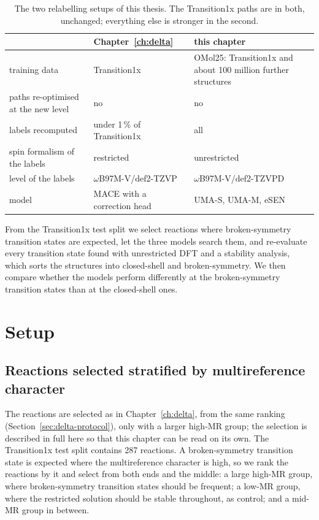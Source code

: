 \begin{table}[h]
\centering
\small
\caption{The two relabelling setups of this thesis. The Transition1x
paths are in both, unchanged; everything else is stronger in the
second.}
\label{tab:delta-vs-omol}
\begin{tabular}{@{}llp{5.5cm}@{}}
\toprule
 & Chapter~\ref{ch:delta} & this chapter \\
\midrule
training data & Transition1x & OMol25: Transition1x and about 100 million further structures \\
paths re-optimised at the new level & no & no \\
labels recomputed & under 1\,\% of Transition1x & all \\
spin formalism of the labels & restricted & unrestricted \\
level of the labels & $\omega$B97M-V/def2-TZVP & $\omega$B97M-V/def2-TZVPD \\
model & MACE with a correction head & UMA-S, UMA-M, eSEN \\
\bottomrule
\end{tabular}
\end{table}

From the Transition1x test split we select reactions where
broken-symmetry transition states are expected, let the three models
search them, and re-evaluate every transition state found with
unrestricted DFT and a stability analysis, which sorts the structures
into closed-shell and broken-symmetry. We then compare whether the
models perform differently at the broken-symmetry transition states
than at the closed-shell ones.

\section{Setup}

\subsection{Reactions selected stratified by multireference character}
\label{sec:reactions}
The reactions are selected as in Chapter~\ref{ch:delta}, from the
same ranking (Section~\ref{sec:delta-protocol}), only with a larger
high-MR group; the selection is described in full here so that this
chapter can be read on its own. The Transition1x test split contains
287 reactions. A broken-symmetry
transition state is expected where the multireference character is
high, so we rank the reactions by it and select from both ends and the
middle: a large high-MR group, where broken-symmetry transition states
should be frequent; a low-MR group, where the restricted solution
should be stable throughout, as control; and a mid-MR group
in between.

